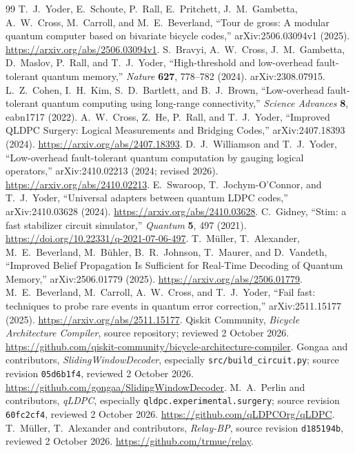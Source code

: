 \documentclass[11pt,a4paper]{article}
\begin{document}
\begingroup\small
\begin{thebibliography}{99}
\setlength{\itemsep}{2pt}
 T.~J.~Yoder, E.~Schoute, P.~Rall, E.~Pritchett, J.~M.~Gambetta, A.~W.~Cross, M.~Carroll, and M.~E.~Beverland, ``Tour de gross: A modular quantum computer based on bivariate bicycle codes,'' arXiv:2506.03094v1 (2025). \url{https://arxiv.org/abs/2506.03094v1}.
 S.~Bravyi, A.~W.~Cross, J.~M.~Gambetta, D.~Maslov, P.~Rall, and T.~J.~Yoder, ``High-threshold and low-overhead fault-tolerant quantum memory,'' \emph{Nature} \textbf{627}, 778--782 (2024). arXiv:2308.07915.
 L.~Z.~Cohen, I.~H.~Kim, S.~D.~Bartlett, and B.~J.~Brown, ``Low-overhead fault-tolerant quantum computing using long-range connectivity,'' \emph{Science Advances} \textbf{8}, eabn1717 (2022).
 A.~W.~Cross, Z.~He, P.~Rall, and T.~J.~Yoder, ``Improved QLDPC Surgery: Logical Measurements and Bridging Codes,'' arXiv:2407.18393 (2024). \url{https://arxiv.org/abs/2407.18393}.
 D.~J.~Williamson and T.~J.~Yoder, ``Low-overhead fault-tolerant quantum computation by gauging logical operators,'' arXiv:2410.02213 (2024; revised 2026). \url{https://arxiv.org/abs/2410.02213}.
 E.~Swaroop, T.~Jochym-O'Connor, and T.~J.~Yoder, ``Universal adapters between quantum LDPC codes,'' arXiv:2410.03628 (2024). \url{https://arxiv.org/abs/2410.03628}.
 C.~Gidney, ``Stim: a fast stabilizer circuit simulator,'' \emph{Quantum} \textbf{5}, 497 (2021). \url{https://doi.org/10.22331/q-2021-07-06-497}.
 T.~M\"uller, T.~Alexander, M.~E.~Beverland, M.~B\"uhler, B.~R.~Johnson, T.~Maurer, and D.~Vandeth, ``Improved Belief Propagation Is Sufficient for Real-Time Decoding of Quantum Memory,'' arXiv:2506.01779 (2025). \url{https://arxiv.org/abs/2506.01779}.
 M.~E.~Beverland, M.~Carroll, A.~W.~Cross, and T.~J.~Yoder, ``Fail fast: techniques to probe rare events in quantum error correction,'' arXiv:2511.15177 (2025). \url{https://arxiv.org/abs/2511.15177}.
 Qiskit Community, \emph{Bicycle Architecture Compiler}, source repository; reviewed 2 October 2026. \url{https://github.com/qiskit-community/bicycle-architecture-compiler}.
 Gongaa and contributors, \emph{SlidingWindowDecoder}, especially \texttt{src/build\_circuit.py}; source revision \texttt{05d6b1f4}, reviewed 2 October 2026. \url{https://github.com/gongaa/SlidingWindowDecoder}.
 M.~A.~Perlin and contributors, \emph{qLDPC}, especially \texttt{qldpc.experimental.surgery}; source revision \texttt{60fc2cf4}, reviewed 2 October 2026. \url{https://github.com/qLDPCOrg/qLDPC}.
 T.~M\"uller, T.~Alexander and contributors, \emph{Relay-BP}, source revision \texttt{d185194b}, reviewed 2 October 2026. \url{https://github.com/trmue/relay}.
\end{thebibliography}
\endgroup
\end{document}
